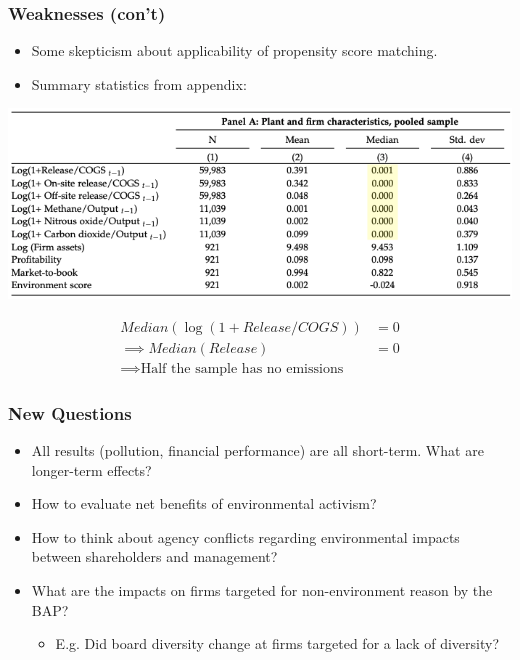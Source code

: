 \documentclass{beamer}
\begin{document}
\begin{frame}
\frametitle{Weaknesses (con't)}

\begin{itemize}[<+->]
\item Some skepticism about applicability of propensity score matching.
\bigskip
\item Summary statistics from appendix:
\end{itemize}

\includegraphics[scale=0.4]{skewness}

\begin{align*}
Median(\log(1+Release/COGS)) &= 0\\
\implies Median(Release) &= 0 \\
\implies \text{Half the sample has no emissions}&
\end{align*}

\end{frame}

\begin{frame}
\frametitle{New Questions}

\begin{itemize}[<+->]
\item All results (pollution, financial performance) are all short-term. What are longer-term effects?
\bigskip
\item How to evaluate net benefits of environmental activism?
\bigskip
\item How to think about agency conflicts regarding environmental impacts between shareholders and management?
\bigskip
\item What are the impacts on firms targeted for non-environment reason by the BAP?
\begin{itemize}
\item E.g. Did board diversity change at firms targeted for a lack of diversity?
\end{itemize}
\end{itemize}

\end{frame}
\end{document}
